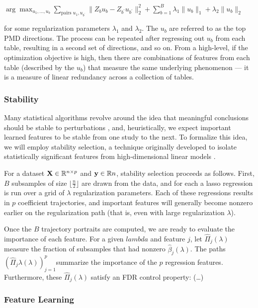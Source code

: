 $\arg\max_{u_1, \dots, u_{b}} \sum_{\text{pairs } u_{1}, u_{b^{\prime}}} \|Z_{b}u_{b} - Z_{b^{\prime}}u_{b^{\prime}}\|_{2}^{2} + \sum_{b= 1}^{B} \lambda_{1}\|u_{b}\|_{1} + \lambda_{2}\|u_{b}\|_{2}$

for some regularization parameters $\lambda_1$ and $\lambda_2$. The $u_b$ are referred to as the top PMD directions. The process can be repeated after regressing out $u_b$ from each table, resulting in a second set of directions, and so on. From a high-level, if the optimization objective is high, then there are combinations of features from each table (described by the $u_b$) that measure the same underlying phenomenon — it is a measure of linear redundancy across a collection of tables.

\subsubsection{Stability}

Many statistical algorithms revolve around the idea that meaningful conclusions should be stable to perturbations \cite{yu2013stability}, and, heuristically, we expect important learned features to be stable from one study to the next. To formalize this idea, we will employ stability selection, a technique originally developed to isolate statistically significant features from high-dimensional linear models  \cite{meinshausen2010stability}.

For a dataset $\mathbf{X}\in \mathbb{R}^{n \times p}$ and $\mathbf{y} \in \mathbb{R}{n}$, stability selection proceeds as follows. First, $B$ subsamples of size $\lfloor \frac{n}{2} \rfloor$ are drawn from the data, and for each a lasso regression is run over a grid of $\lambda$ regularization parameters. Each of these regressions results in $p$ coefficient trajectories, and important features will generally become nonzero earlier on the regularization path (that is, even with large regularization $\lambda$).

Once the $B$ trajectory portraits are computed, we are ready to evaluate the importance of each feature. For a given $lambda$ and feature $j$, let $\hat{\Pi}_{j}\left(\lambda\right)$ measure the fraction of subsamples that had nonzero $\hat{\beta}_j\left(\lambda\right)$.  The paths $\left(\hat{\Pi}_{j}\lambda\left(\lambda\right)\right)_{j = 1}^{p}$summarize the importance of the $p$ regression features. Furthermore, these $\hat{\Pi}_{j}\left(\lambda\right)$ satisfy an FDR control property: (…)

\subsubsection{Feature Learning}

